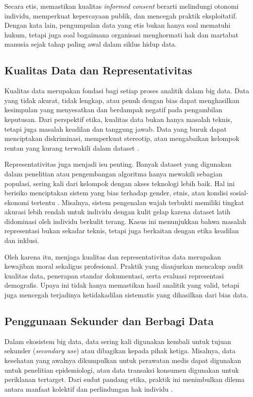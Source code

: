 Secara etis, memastikan kualitas \textit{informed consent} berarti melindungi otonomi individu, memperkuat kepercayaan publik, dan mencegah praktik eksploitatif. Dengan kata lain, pengumpulan data yang etis bukan hanya soal mematuhi hukum, tetapi juga soal bagaimana organisasi menghormati hak dan martabat manusia sejak tahap paling awal dalam siklus hidup data.

\subsection{Kualitas Data dan Representativitas}

Kualitas data merupakan fondasi bagi setiap proses analitik dalam big data. Data yang tidak akurat, tidak lengkap, atau penuh dengan bias dapat menghasilkan kesimpulan yang menyesatkan dan berdampak negatif pada pengambilan keputusan. Dari perspektif etika, kualitas data bukan hanya masalah teknis, tetapi juga masalah keadilan dan tanggung jawab. Data yang buruk dapat menciptakan diskriminasi, memperkuat stereotip, atau mengabaikan kelompok rentan yang kurang terwakili dalam dataset \cite{rahm2000dataquality}.  

Representativitas juga menjadi isu penting. Banyak dataset yang digunakan dalam penelitian atau pengembangan algoritma hanya mewakili sebagian populasi, sering kali dari kelompok dengan akses teknologi lebih baik. Hal ini berisiko menciptakan sistem yang bias terhadap gender, etnis, atau kondisi sosial-ekonomi tertentu \cite{barocas2016big}. Misalnya, sistem pengenalan wajah terbukti memiliki tingkat akurasi lebih rendah untuk individu dengan kulit gelap karena dataset latih didominasi oleh individu berkulit terang. Kasus ini menunjukkan bahwa masalah representasi bukan sekadar teknis, tetapi juga berkaitan dengan etika keadilan dan inklusi.  

Oleh karena itu, menjaga kualitas dan representativitas data merupakan kewajiban moral sekaligus profesional. Praktik yang dianjurkan mencakup audit kualitas data, penerapan standar dokumentasi, serta evaluasi representasi demografis. Upaya ini tidak hanya memastikan hasil analitik yang valid, tetapi juga mencegah terjadinya ketidakadilan sistematis yang dihasilkan dari bias data.

\subsection{Penggunaan Sekunder dan Berbagi Data}

Dalam ekosistem big data, data sering kali digunakan kembali untuk tujuan sekunder (\textit{secondary use}) atau dibagikan kepada pihak ketiga. Misalnya, data kesehatan yang awalnya dikumpulkan untuk perawatan medis dapat digunakan untuk penelitian epidemiologi, atau data transaksi konsumen digunakan untuk periklanan tertarget. Dari sudut pandang etika, praktik ini menimbulkan dilema antara manfaat kolektif dan perlindungan hak individu \cite{nissenbaum2004privacy}.  

